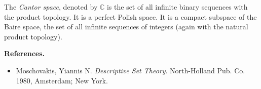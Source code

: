 \documentclass[12pt]{article}
\begin{document}
The {\it Cantor space}, denoted by $\mathbb{C}$ is the set of all infinite binary sequences with the product topology. It is a perfect Polish space. It is a compact subspace of the Baire space, the set of all infinite sequences of integers (again with the natural product topology).

{\bf References.}
\begin{itemize}
\item Moschovakis, Yiannis N.  \emph{Descriptive Set Theory}.  North-Holland Pub. Co.  1980, Amsterdam; New York.
\end{itemize}
\end{document}
